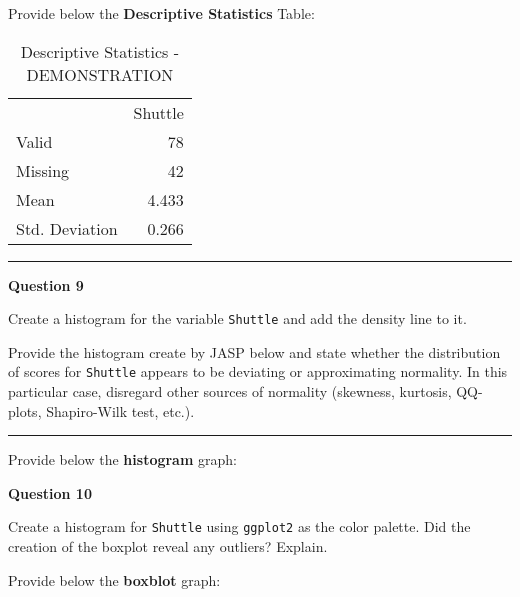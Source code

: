 \documentclass[11pt,]{article}
\begin{document}
Provide below the \textbf{Descriptive Statistics} Table:

\begin{table}[h]
    \centering
    \caption{Descriptive Statistics - DEMONSTRATION}
    \label{tab:descriptiveStatistics}
    {
        \begin{tabular}{lr}
            \toprule
             & Shuttle  \\
            \cmidrule[0.4pt]{1-2}
            Valid & 78  \\
            Missing & 42  \\
            Mean & 4.433  \\
            Std. Deviation & 0.266  \\
            \bottomrule
        \end{tabular}
    }
\end{table}

\begin{center}\rule{0.5\linewidth}{0.5pt}\end{center}

\textbf{Question 9}

Create a histogram for the variable \texttt{Shuttle} and add the density
line to it.

Provide the histogram create by JASP below and state whether the
distribution of scores for \texttt{Shuttle} appears to be deviating or
approximating normality. In this particular case, disregard other
sources of normality (skewness, kurtosis, QQ-plots, Shapiro-Wilk test,
etc.).

\begin{center}\rule{0.5\linewidth}{0.5pt}\end{center}

Provide below the \textbf{histogram} graph:

\textbf{Question 10}

Create a histogram for \texttt{Shuttle} using \texttt{ggplot2} as the
color palette. Did the creation of the boxplot reveal any outliers?
Explain.

Provide below the \textbf{boxblot} graph:
\end{document}
